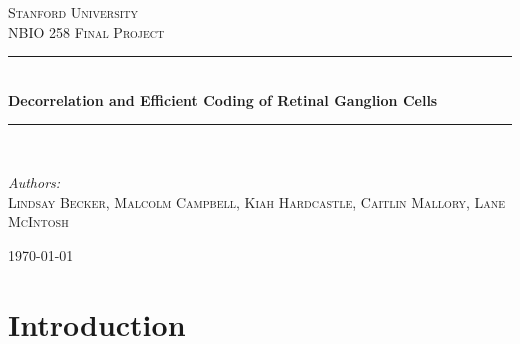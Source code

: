 \documentclass[12pt]{article}
\begin{document}
\begin{titlepage}

\newcommand{\HRule}{\rule{\linewidth}{0.5mm}} %

\center %

\textsc{\LARGE Stanford University}\\[1.5cm] %
\textsc{\Large NBIO 258 Final Project}\\[0.5cm] %

\vspace{3cm}


\HRule \\[0.4cm]
{ \huge \bfseries Decorrelation and Efficient Coding of Retinal Ganglion Cells}\\[0.4cm] %
\HRule \\[1.5cm]
 
\vspace{2cm}

\begin{flushleft} \large
\textit{Authors:}\\
\textsc{Lindsay Becker, Malcolm Campbell, Kiah Hardcastle, Caitlin Mallory, Lane McIntosh} %
\end{flushleft}

\vspace{4cm}



{\large \today}\\[3cm] 

 
 \vfill %

\end{titlepage}

\newpage



\section{Introduction}
\end{document}
